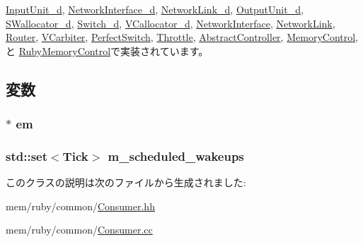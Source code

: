 \hyperlink{classInputUnit__d_ae674290a26ecbd622c5160e38e8a4fe9}{InputUnit\_\-d}, \hyperlink{classNetworkInterface__d_ae674290a26ecbd622c5160e38e8a4fe9}{NetworkInterface\_\-d}, \hyperlink{classNetworkLink__d_ae674290a26ecbd622c5160e38e8a4fe9}{NetworkLink\_\-d}, \hyperlink{classOutputUnit__d_ae674290a26ecbd622c5160e38e8a4fe9}{OutputUnit\_\-d}, \hyperlink{classSWallocator__d_ae674290a26ecbd622c5160e38e8a4fe9}{SWallocator\_\-d}, \hyperlink{classSwitch__d_ae674290a26ecbd622c5160e38e8a4fe9}{Switch\_\-d}, \hyperlink{classVCallocator__d_ae674290a26ecbd622c5160e38e8a4fe9}{VCallocator\_\-d}, \hyperlink{classNetworkInterface_ae674290a26ecbd622c5160e38e8a4fe9}{NetworkInterface}, \hyperlink{classNetworkLink_ae674290a26ecbd622c5160e38e8a4fe9}{NetworkLink}, \hyperlink{classRouter_ae674290a26ecbd622c5160e38e8a4fe9}{Router}, \hyperlink{classVCarbiter_ae674290a26ecbd622c5160e38e8a4fe9}{VCarbiter}, \hyperlink{classPerfectSwitch_ae674290a26ecbd622c5160e38e8a4fe9}{PerfectSwitch}, \hyperlink{classThrottle_ae674290a26ecbd622c5160e38e8a4fe9}{Throttle}, \hyperlink{classAbstractController_a623e3e7d1b1c725d70009f7b01a421b9}{AbstractController}, \hyperlink{classMemoryControl_a623e3e7d1b1c725d70009f7b01a421b9}{MemoryControl}, と \hyperlink{classRubyMemoryControl_ae674290a26ecbd622c5160e38e8a4fe9}{RubyMemoryControl}で実装されています。

\subsection{変数}
\hypertarget{classConsumer_a75e14198badfddb1422adb9833fbd275}{
\subsubsection[{em}]{$\ast$ {\bf em}}}
\label{classConsumer_a75e14198badfddb1422adb9833fbd275}
\hypertarget{classConsumer_a80158caf2e9b370c03daba358a438493}{
\subsubsection[{m\_\-scheduled\_\-wakeups}]{\setlength{\rightskip}{0pt plus 5cm}std::set$<${\bf Tick}$>$ {\bf m\_\-scheduled\_\-wakeups}}}
\label{classConsumer_a80158caf2e9b370c03daba358a438493}


このクラスの説明は次のファイルから生成されました:\begin{DoxyCompactItemize}
\item 
mem/ruby/common/\hyperlink{Consumer_8hh}{Consumer.hh}\item 
mem/ruby/common/\hyperlink{Consumer_8cc}{Consumer.cc}\end{DoxyCompactItemize}
